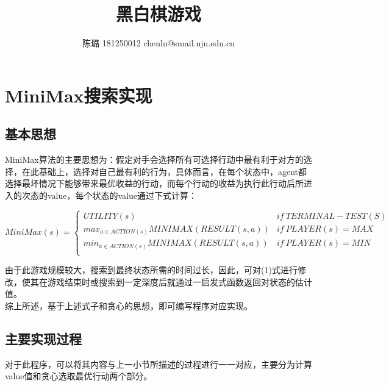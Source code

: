 \documentclass[UTF8]{article}
\begin{document}
	\title{黑白棋游戏}
	\author{陈璐 181250012 chenlu@smail.nju.edu.cn}
	
	\maketitle
	
	\tableofcontents
	
\section{MiniMax搜索实现}
\subsection{基本思想}
	\indent MiniMax算法的主要思想为：假定对手会选择所有可选择行动中最有利于对方的选择，在此基础上，选择对自己最有利的行为，具体而言，在每个状态中，agent都选择最坏情况下能够带来最优收益的行动，而每个行动的收益为执行此行动后所进入的次态的value，每个状态的value通过下式计算：\\
	\begin{footnotesize}
		\begin{equation}
		MiniMax(s)=
		\begin{cases}
		UTILITY(s) & if\ TERMINAL-TEST(S) \\ 
		max_{a\in ACTION(s)}MINIMAX(RESULT(s,a))& if\ PLAYER(s)=MAX \\ 
		min_{a\in ACTION(s)}MINIMAX(RESULT(s,a))& if\ PLAYER(s)=MIN \\
		\end{cases}
		\end{equation}
	\end{footnotesize}

	\indent 由于此游戏规模较大，搜索到最终状态所需的时间过长，因此，可对(1)式进行修改，使其在游戏结束时或搜索到一定深度后就通过一启发式函数返回对状态的估计值。\\
	\indent 综上所述，基于上述式子和贪心的思想，即可编写程序对应实现。

\subsection{主要实现过程}
	\indent 对于此程序，可以将其内容与上一小节所描述的过程进行一一对应，主要分为计算value值和贪心选取最优行动两个部分。
	
\end{document}

